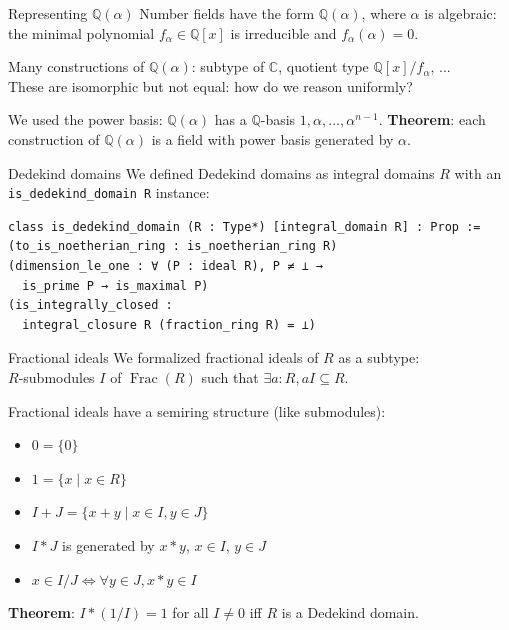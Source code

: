 \documentclass{beamer}
\newcommand{\C}{\mathbb{C}}
\newcommand{\lean}[1]{\texttt{#1}\xspace}
\newcommand{\Q}{\mathbb{Q}}
\newcommand{\Z}{\mathbb{Z}}
\DeclareMathOperator{\Frac}{Frac}
\begin{document}
%
%

\begin{frame}{Representing $\Q(\alpha)$}
	Number fields have the form $\Q(\alpha)$, where $\alpha$ is algebraic:\\
	the minimal polynomial $f_\alpha \in \Q[x]$ is irreducible and $f_\alpha(\alpha) = 0$.

	Many constructions of $\Q(\alpha)$: subtype of $\C$, quotient type $\Q[x] / f_\alpha$, ...\\
	These are isomorphic but not equal: how do we reason uniformly?

\pause
	We used the \alert{power basis}: $\Q(\alpha)$ has a $\Q$-basis $1, \alpha, \dots, \alpha^{n - 1}$.
	\textbf{Theorem}: each construction of $\Q(\alpha)$ is a field with power basis generated by $\alpha$.
\end{frame}

\begin{frame}[fragile]{Dedekind domains}
	We defined Dedekind domains as integral domains $R$ with an \lean{is\_dedekind\_domain R} instance:
\begin{lstlisting}
class is_dedekind_domain (R : Type*) [integral_domain R] : Prop :=
(to_is_noetherian_ring : is_noetherian_ring R)
(dimension_le_one : ∀ (P : ideal R), P ≠ ⊥ →
  is_prime P → is_maximal P)
(is_integrally_closed :
  integral_closure R (fraction_ring R) = ⊥)
\end{lstlisting}

\end{frame}

\begin{frame}{Fractional ideals}
	We formalized fractional ideals of $R$ as a subtype:\\
	$R$-submodules $I$ of $\Frac(R)$ such that $\exists a : R, a I \subseteq R$.

	Fractional ideals have a semiring structure (like submodules):\\
	\begin{itemize}
		\item $0 = \{0\}$
		\item $1 = \{x \mid x \in R\}$
		\item $I + J = \{x + y \mid x \in I, y \in J\}$
		\item $I * J$ is generated by $x * y$, $x \in I$, $y \in J$
		\item $x \in I / J \iff \forall y \in J, x * y \in I$
	\end{itemize}

\pause
	\textbf{Theorem}: $I * (1 / I) = 1$ for all $I \ne 0$ iff $R$ is a Dedekind domain.
\end{frame}
\end{document}

